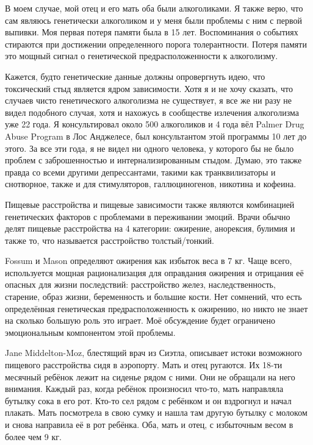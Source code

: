 \documentclass[10pt, fleqn]{article}
\begin{document}
В моем случае, мой отец и его мать оба были алкоголиками. Я также верю, что сам являюсь генетически алкоголиком и у меня были проблемы с ним с первой выпивки. Моя первая потеря памяти была в 15 лет. Воспоминания о событиях стираются при достижении определенного порога толерантности. Потеря памяти это мощный сигнал о генетической предрасположенности к алкоголизму.

Кажется, будто генетические данные должны опровергнуть идею, что токсический стыд является ядром зависимости. Хотя я и не хочу сказать, что случаев чисто генетического алкоголизма не существует, я все же ни разу не видел подобного случая, хотя и нахожусь в сообществе излечения алкоголизма уже 22 года. Я консультировал около 500 алкоголиков и 4 года вёл Palmer Drug Abuse Program в Лос Анджелесе, был консультантом этой программы 10 лет до этого. За все эти года, я не видел ни одного человека, у которого бы не было проблем с заброшенностью и интернализированным стыдом. Думаю, это также правда со всеми другими депрессантами, такими как транквилизаторы и снотворное, также и для стимуляторов, галлюциногенов, никотина и кофеина.


Пищевые расстройства и пищевые зависимости также являются комбинацией генетических факторов с проблемами в переживании эмоций. Врачи обычно делят пищевые расстройства на 4 категории: ожирение, анорексия, булимия и также то, что называется расстройство толстый/тонкий.


Fossum и Mason определяют ожирения как избыток веса в 7 кг. Чаще всего, используется мощная рационализация для оправдания ожирения и отрицания её опасных для жизни последствий: расстройство желез, наследственность, старение, образ жизни, беременность и большие кости. Нет сомнений, что есть определённая генетическая предрасположенность к ожирению, но никто не знает на сколько большую роль это играет. Моё обсуждение будет ограничено эмоциональным компонентом этой проблемы.

Jane Middelton-Moz, блестящий врач из Сиэтла, описывает истоки возможного пищевого расстройства сидя в аэропорту. Мать и отец ругаются. Их 18-ти месячный ребёнок лежит на сиденье рядом с ними. Они не обращали на него внимания. Каждый раз, когда ребёнок произносил что-то, мать направляла бутылку сока в его рот. Кто-то сел рядом с ребёнком и он вздрогнул и начал плакать. Мать посмотрела в свою сумку и нашла там другую бутылку с молоком и снова направила её в рот ребёнка. Оба, мать и отец, с избыточным весом в более чем 9 кг.
\end{document}
